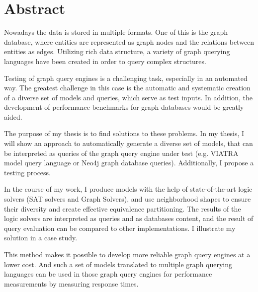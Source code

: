 \chapter*{Abstract}

Nowadays the data is stored in multiple formats. One of this is the graph database, where entities are represented as graph nodes and the relations between entities as edges. Utilizing rich data structure, a variety of graph querying languages have been created in order to query complex structures.

Testing of graph query engines is a challenging task, especially in an automated way. The greatest challenge in this case is the automatic and systematic creation of a diverse set of models and queries, which serve as test inputs. In addition, the development of performance benchmarks for graph databases would be greatly aided.

The purpose of my thesis is to find solutions to these problems.  In my thesis, I will show an approach to automatically generate a diverse set of models, that can be interpreted as queries of the graph query engine under test (e.g. VIATRA model query language or Neo4j graph database queries). Additionally, I propose a testing process.

In the course of my work, I produce models with the help of state-of-the-art logic solvers (SAT solvers and Graph Solvers), and use neighborhood shapes to ensure their diversity and create effective equivalence partitioning. The results of the logic solvers are interpreted as queries and as databases content, and the result of query evaluation can be compared to other implementations. I illustrate my solution in a case study.

This method makes it possible to develop more reliable graph query engines at a lower cost. And such a set of models translated to multiple graph querying languages can be used in those graph query engines for performance measurements by measuring response times.


\vfill
\selectthesislanguage

\setcounter{romanPage}{\value{page}}
